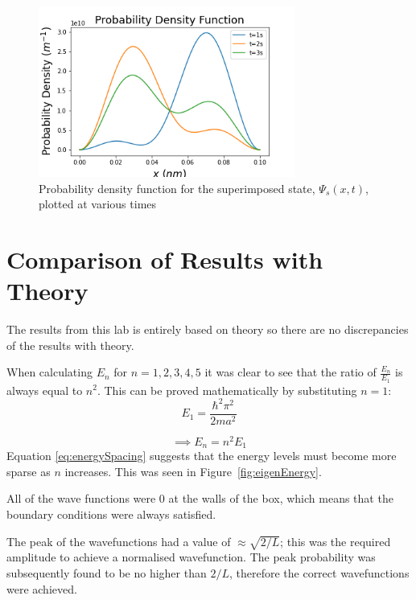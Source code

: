 \begin{figure}[h]
    \centering
    \includegraphics[width=0.75\textwidth]{lab1/images/superpositionPDF.png}
    \captionsetup{font = it, labelfont = bf, width=.91\linewidth, justification=centering}
    \caption{Probability density function for the superimposed state, $\Psi_s (x,t)$, plotted at various times}
    \label{fig:superPosPDF}
\end{figure}

\section{Comparison of Results with Theory}

The results from this lab is entirely based on theory so there are no discrepancies of the results with theory.

When calculating $E_n$ for $n=1,2,3,4,5$ it was clear to see that the ratio of $\frac{E_n}{E_1}$ is always equal to $n^{2}$. This can be proved mathematically by substituting $n=1$:
$$E_1 = \frac{\hbar ^{2}\pi^{2}}{2ma^{2}}$$

\begin{equation}\label{eq:energySpacing}
\implies E_n =  n^{2}E_1
\end{equation}
Equation \ref{eq:energySpacing} suggests that the energy levels must become more sparse as $n$ increases. This was seen in Figure~\ref{fig:eigenEnergy}.

All of the wave functions were 0 at the walls of the box, which means that the boundary conditions were always satisfied.

The peak of the wavefunctions had a value of $\approx \sqrt{2/L}$; this was the required amplitude to achieve a normalised wavefunction. The peak probability was subsequently found to be no higher than $2/L$, therefore the correct wavefunctions were achieved.

